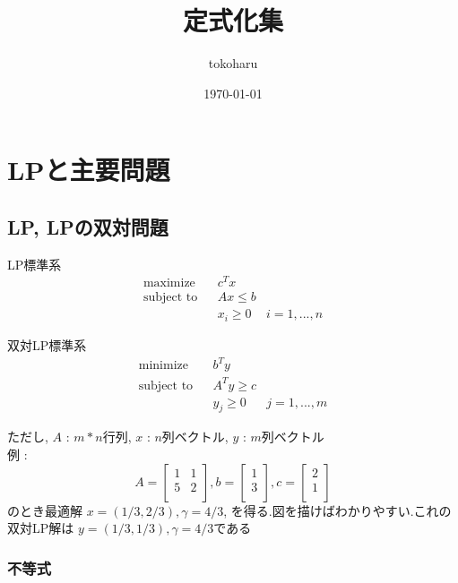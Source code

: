 \documentclass[13pt, a4paper, landscape]{jarticle}
\title{定式化集}
\author{tokoharu}
\date {\today}
\theoremstyle{nonitalic} %
\begin{document}
\maketitle

\section{LPと主要問題}
\subsection {LP, LPの双対問題}

LP標準系
\begin{align}
 &&&&&\textrm{maximize}   && c^Tx \\
 &&&&&\textrm{subject to} && Ax \leq b  &&&&&\\
 &&&&&                    && x_i \geq 0 & i = 1,...,n &&&&&
\end{align}

双対LP標準系
\begin{align}
 &&&&&\textrm{minimize}   && b^Ty \\
 &&&&&\textrm{subject to} && A^T y \geq c  &&&&&\\
 &&&&&                    && y_j \geq 0 & j = 1,...,m &&&&&
\end{align}

ただし, 
$A$ : $m*n$行列, 
$x$ : $n$列ベクトル, 
$y$ : $m$列ベクトル \\

例 : 
\begin{equation*}
 A = 
 \left[\begin{array}{cc}
  1 & 1 \\
  5 & 2 \\
 \end{array}\right],
 b = 
 \left[\begin{array}{c}
     1 \\
     3 \\
   \end{array}\right],
 c = 
 \left[\begin{array}{c}
     2 \\
     1 \\
 \end{array}\right]
\end{equation*}
のとき最適解 $x = (1/3, 2/3) , \gamma = 4/3  $, を得る.図を描けばわかりやすい.これの双対LP解は
$y = (1/3, 1/3), \gamma = 4/3$である

\subsubsection{不等式}
\end{document}

